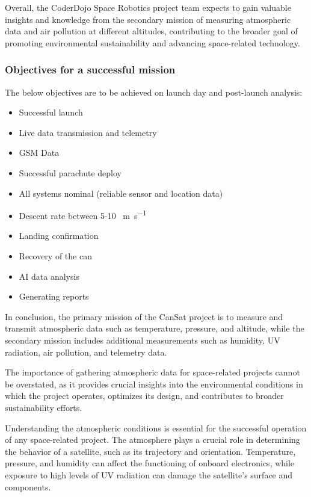 \documentclass[11pt]{article}
\begin{document}
Overall, the CoderDojo Space Robotics project team expects to gain valuable insights and knowledge from the secondary mission of measuring atmospheric data and air pollution at different altitudes, contributing to the broader goal of promoting environmental sustainability and advancing space-related technology.

\subsubsection{Objectives for a successful mission}

The below objectives are to be achieved on launch day and post-launch analysis:
\begin{multicols}{2}[\vspace{-0.75\baselineskip}]
\begin{itemize}[leftmargin=1cm,itemindent=0.5cm, noitemsep, topsep=2pt, label=]
    \item Successful launch
    \item Live data transmission and  telemetry
    \item GSM Data
    \item Successful parachute deploy
    \item All systems nominal (reliable sensor and location data)
    \item Descent rate between 5-10 \SI{}{\meter\per\second}
    \item Landing confirmation
    \item Recovery of the can
    \item AI data analysis
    \item Generating reports
\end{itemize}
\end{multicols}

In conclusion, the primary mission of the CanSat project is to measure and transmit atmospheric data such as temperature, pressure, and altitude, while the secondary mission includes additional measurements such as humidity, UV radiation, air pollution, and telemetry data. 

The importance of gathering atmospheric data for space-related projects cannot be overstated, as it provides crucial insights into the environmental conditions in which the project operates, optimizes its design, and contributes to broader sustainability efforts.

Understanding the atmospheric conditions is essential for the successful operation of any space-related project. The atmosphere plays a crucial role in determining the behavior of a satellite, such as its trajectory and orientation. Temperature, pressure, and humidity can affect the functioning of onboard electronics, while exposure to high levels of UV radiation can damage the satellite's surface and components.
\end{document}
